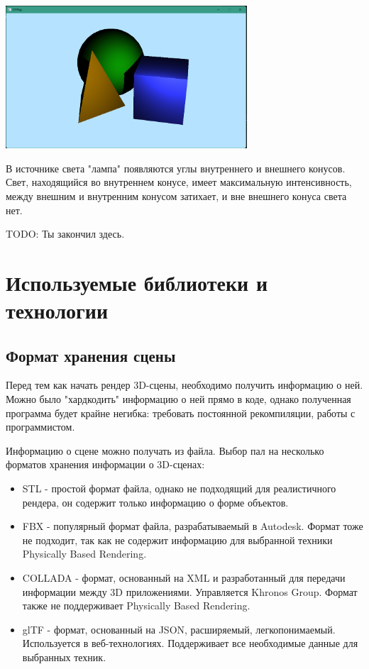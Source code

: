 \documentclass[a4paper,14pt]{extarticle}
\newcommand\makenewfig[3] {
    \captionsetup{format=imagecaption}
    \begin{center}
        #1
        \nopagebreak
        \captionof{figure}{#2}
        \nopagebreak
        \label{#3}
    \end{center}
}
\begin{document}
\makenewfig{\includegraphics[width=90mm]{raytrace_5}}{Точечный свет с тенью}{ris:raytrace_5}

В источнике света "лампа" появляются углы внутреннего и внешнего конусов. Свет, находящийся во внутреннем конусе, имеет максимальную интенсивность, 
между внешним и внутренним конусом затихает, и вне внешнего конуса света нет. 

TODO: Ты закончил здесь.

\section{Используемые библиотеки и технологии}
\subsection{Формат хранения сцены}
Перед тем как начать рендер 3D-сцены, необходимо получить информацию о ней.
Можно было "хардкодить" информацию о ней прямо в коде, однако полученная программа 
будет крайне негибка: требовать постоянной рекомпиляции, работы с программистом.

Информацию о сцене можно получать из файла. Выбор пал на несколько форматов хранения информации о 3D-сценах:
\begin{itemize}
    \item STL - простой формат файла, однако не подходящий для реалистичного рендера, он содержит только информацию о форме объектов.
    \item FBX - популярный формат файла, разрабатываемый в Autodesk. Формат тоже не подходит, 
    так как не содержит информацию для выбранной техники Physically Based Rendering.
    \item COLLADA - формат, основанный на XML и разработанный для передачи информации между 3D приложениями. Управляется Khronos Group. 
    Формат также не поддерживает Physically Based Rendering.
    \item glTF - формат, основанный на JSON, расширяемый, легкопонимаемый. Используется в веб-технологиях. 
    Поддерживает все необходимые данные для выбранных техник. 
\end{itemize}
\end{document}
